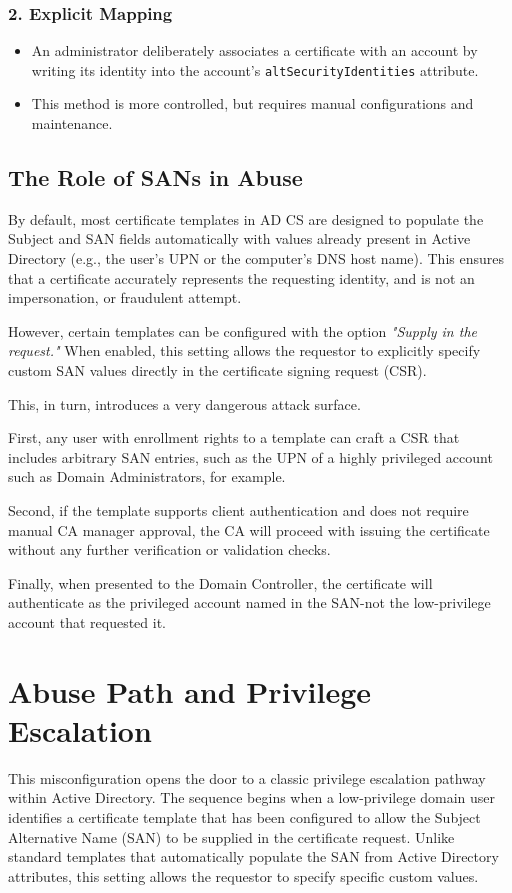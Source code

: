 {\subsubsection{2. Explicit Mapping}
\begin{itemize}
    \item An administrator deliberately associates a certificate with an account by writing its identity into the account's \texttt{altSecurityIdentities} attribute.
    \item This method is more controlled, but requires manual configurations and maintenance.
\end{itemize}

\subsection{The Role of SANs in Abuse}
By default, most certificate templates in AD CS are designed to populate the Subject and SAN fields automatically with values already present in Active Directory (e.g., the user's UPN or the computer's DNS host name). This ensures that a certificate accurately represents the requesting identity, and is not an impersonation, or fraudulent attempt.

However, certain templates can be configured with the option \textit{"Supply in the request."} When enabled, this setting allows the requestor to explicitly specify custom SAN values directly in the certificate signing request (CSR).

This, in turn, introduces a very dangerous attack surface.

First, any user with enrollment rights to a template can craft a CSR that includes arbitrary SAN entries, such as the UPN of a highly privileged account such as Domain Administrators, for example.

Second, if the template supports client authentication and does not require manual CA manager approval, the CA will proceed with issuing the certificate without any further verification or validation checks.

Finally, when presented to the Domain Controller, the certificate will authenticate as the privileged account named in the SAN-not the low-privilege account that requested it.

\section{Abuse Path and Privilege Escalation}
This misconfiguration opens the door to a classic privilege escalation pathway within Active Directory. The sequence begins when a low-privilege domain user identifies a certificate template that has been configured to allow the Subject Alternative Name (SAN) to be supplied in the certificate request. Unlike standard templates that automatically populate the SAN from Active Directory attributes, this setting allows the requestor to specify specific custom values.

}
